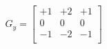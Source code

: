 \documentclass[10pt]{article}
\begin{document}
\begin{align*}G_y = \begin{bmatrix}
+1 & +2 & +1\\
0 & 0 & 0\\
-1 & -2 & -1\\
\end{bmatrix}\end{align*}
\end{document}
